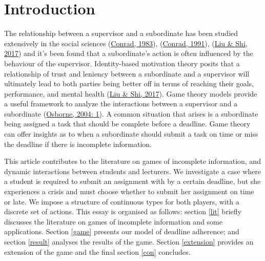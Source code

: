\documentclass[11pt,preprint, authoryear]{elsarticle}
\numberwithin{equation}{section}
\numberwithin{figure}{section}
\numberwithin{table}{section}
\begin{document}
\renewcommand{\contentsname}{Table of Contents}
{\tableofcontents}

\pagestyle{fancy}
\chead{}
\rhead{}
\lfoot{}
\lhead{}
\cfoot{}


\headsep 35pt %




\newpage

\hypertarget{introduction}{%
\section{\texorpdfstring{Introduction
\label{intro}}{Introduction }}\label{introduction}}

The relationship between a supervisor and a subordinate has been studied
extensively in the social sciences
(\protect\hyperlink{ref-power}{Conrad, 1983}),
(\protect\hyperlink{ref-comm}{Conrad, 1991}),
(\protect\hyperlink{ref-trust}{Liu \& Shi, 2017}) and it's been found
that a subordinate's action is often influenced by the behaviour of the
supervisor. Identity-based motivation theory posits that a relationship
of trust and leniency between a subordinate and a supervisor will
ultimately lead to both parties being better off in terms of reaching
their goals, performance, and mental health
(\protect\hyperlink{ref-trust}{Liu \& Shi, 2017}). Game theory models
provide a useful framework to analyze the interactions between a
supervisor and a subordinate (\protect\hyperlink{ref-book}{Osborne,
2004: 1}). A common situation that arises is a subordinate being
assigned a task that should be complete before a deadline. Game theory
can offer insights as to when a subordinate should submit a task on time
or miss the deadline if there is incomplete information.

This article contributes to the literature on games of incomplete
information, and dynamic interactions between students and lecturers. We
investigate a case where a student is required to submit an assignment
with by a certain deadline, but she experiences a crisis and must choose
whether to submit her assignment on time or late. We impose a structure
of continuous types for both players, with a discrete set of actions.
This essay is organised as follows: section \ref{lit} briefly discusses
the literature on games of incomplete information and some applications.
Section \ref{game} presents our model of deadline adherence; and section
\ref{result} analyses the results of the game. Section \ref{extension}
provides an extension of the game and the final section \ref{con}
concludes.
\end{document}
